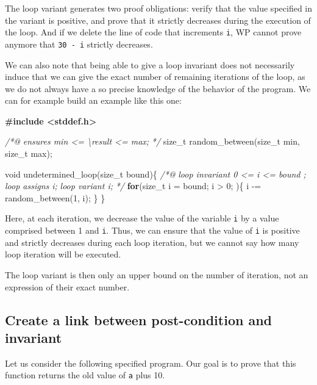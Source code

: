 \documentclass[12pt,francais,]{scrbook}
\newenvironment{Shaded}{}{}
\newcommand{\KeywordTok}[1]{\textcolor[rgb]{0.00,0.44,0.13}{\textbf{{#1}}}}
\newcommand{\DataTypeTok}[1]{\textcolor[rgb]{0.56,0.13,0.00}{{#1}}}
\newcommand{\DecValTok}[1]{\textcolor[rgb]{0.25,0.63,0.44}{{#1}}}
\newcommand{\CommentTok}[1]{\textcolor[rgb]{0.38,0.63,0.69}{\textit{{#1}}}}
\newcommand{\ErrorTok}[1]{\textcolor[rgb]{1.00,0.00,0.00}{\textbf{{#1}}}}
\newcommand{\NormalTok}[1]{{#1}}
\begin{document}
The loop variant generates two proof obligations: verify that the value
specified in the variant is positive, and prove that it strictly
decreases during the execution of the loop. And if we delete the line of
code that increments \texttt{i}, WP cannot prove anymore that
\texttt{30\ -\ i} strictly decreases.

We can also note that being able to give a loop invariant does not
necessarily induce that we can give the exact number of remaining
iterations of the loop, as we do not always have a so precise knowledge
of the behavior of the program. We can for example build an example like
this one:
\clearpage
\begin{footnotesize}\begin{Shaded}
\begin{Highlighting}[]
\ErrorTok{#include <stddef.h>}

\CommentTok{/*@}
\CommentTok{  ensures min <= \textbackslash{}result <= max;}
\CommentTok{*/}
\NormalTok{size_t random_between(size_t min, size_t max);}

\DataTypeTok{void} \NormalTok{undetermined_loop(size_t bound)\{}
  \CommentTok{/*@}
\CommentTok{    loop invariant 0 <= i <= bound ;}
\CommentTok{    loop assigns i;}
\CommentTok{    loop variant i;}
\CommentTok{   */}
  \KeywordTok{for}\NormalTok{(size_t i = bound; i > }\DecValTok{0}\NormalTok{; )\{}
    \NormalTok{i -= random_between(}\DecValTok{1}\NormalTok{, i);}
  \NormalTok{\}}
\NormalTok{\}}
\end{Highlighting}
\end{Shaded}\end{footnotesize}

Here, at each iteration, we decrease the value of the variable
\texttt{i} by a value comprised between 1 and \texttt{i}. Thus, we can
ensure that the value of \texttt{i} is positive and strictly decreases
during each loop iteration, but we cannot say how many loop iteration
will be executed.

The loop variant is then only an upper bound on the number of iteration,
not an expression of their exact number.

\subsection{Create a link between post-condition and
invariant}\label{create-a-link-between-post-condition-and-invariant}

Let us consider the following specified program. Our goal is to prove
that this function returns the old value of \texttt{a} plus 10.
\end{document}
